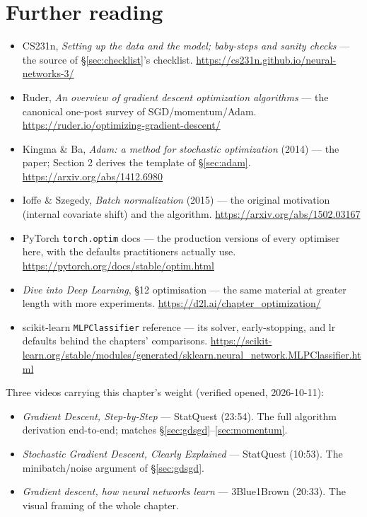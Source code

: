 \section*{Further reading}
\begin{itemize}
\item CS231n, \emph{Setting up the data and the model; baby-steps and
sanity checks} --- the source of \S\ref{sec:checklist}'s checklist.
\url{https://cs231n.github.io/neural-networks-3/}
\item Ruder, \emph{An overview of gradient descent optimization
algorithms} --- the canonical one-post survey of SGD/momentum/Adam.
\url{https://ruder.io/optimizing-gradient-descent/}
\item Kingma \& Ba, \emph{Adam: a method for stochastic optimization}
(2014) --- the paper; Section 2 derives the template of
\S\ref{sec:adam}.
\url{https://arxiv.org/abs/1412.6980}
\item Ioffe \& Szegedy, \emph{Batch normalization} (2015) --- the
original motivation (internal covariate shift) and the algorithm.
\url{https://arxiv.org/abs/1502.03167}
\item PyTorch \texttt{torch.optim} docs --- the production versions of
every optimiser here, with the defaults practitioners actually use.
\url{https://pytorch.org/docs/stable/optim.html}
\item \emph{Dive into Deep Learning}, \S12 optimisation --- the same
material at greater length with more experiments.
\url{https://d2l.ai/chapter_optimization/}
\item scikit-learn \texttt{MLPClassifier} reference --- its solver,
early-stopping, and lr defaults behind the chapters' comparisons.
\url{https://scikit-learn.org/stable/modules/generated/sklearn.neural_network.MLPClassifier.html}
\end{itemize}

\begin{rulebox}
Three videos carrying this chapter's weight (verified opened,
2026-10-11):
\begin{itemize}
\item \emph{Gradient Descent, Step-by-Step} --- StatQuest (23:54).
The full algorithm derivation end-to-end; matches
\S\ref{sec:gdsgd}--\ref{sec:momentum}.
\item \emph{Stochastic Gradient Descent, Clearly Explained} ---
StatQuest (10:53). The minibatch/noise argument of \S\ref{sec:gdsgd}.
\item \emph{Gradient descent, how neural networks learn} ---
3Blue1Brown (20:33). The visual framing of the whole chapter.
\end{itemize}
\end{rulebox}

